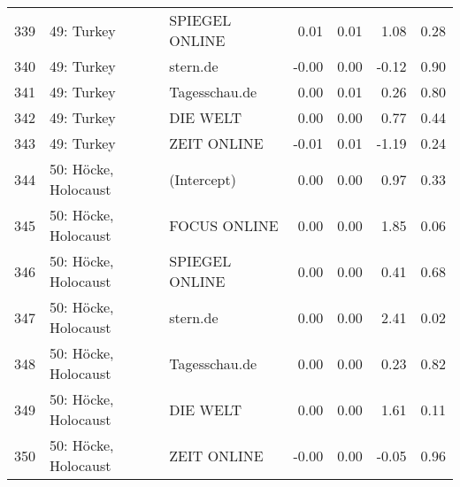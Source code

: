 \begin{table}[ht]
{\begin{tabular}{rllrrrr}
  339 & 49: Turkey & SPIEGEL ONLINE & 0.01 & 0.01 & 1.08 & 0.28 \\ 
  340 & 49: Turkey & stern.de & -0.00 & 0.00 & -0.12 & 0.90 \\ 
  341 & 49: Turkey & Tagesschau.de & 0.00 & 0.01 & 0.26 & 0.80 \\ 
  342 & 49: Turkey & DIE WELT & 0.00 & 0.00 & 0.77 & 0.44 \\ 
  343 & 49: Turkey & ZEIT ONLINE & -0.01 & 0.01 & -1.19 & 0.24 \\ 
  344 & 50: Höcke, Holocaust & (Intercept) & 0.00 & 0.00 & 0.97 & 0.33 \\ 
  345 & 50: Höcke, Holocaust & FOCUS ONLINE & 0.00 & 0.00 & 1.85 & 0.06 \\ 
  346 & 50: Höcke, Holocaust & SPIEGEL ONLINE & 0.00 & 0.00 & 0.41 & 0.68 \\ 
  347 & 50: Höcke, Holocaust & stern.de & 0.00 & 0.00 & 2.41 & 0.02 \\ 
  348 & 50: Höcke, Holocaust & Tagesschau.de & 0.00 & 0.00 & 0.23 & 0.82 \\ 
  349 & 50: Höcke, Holocaust & DIE WELT & 0.00 & 0.00 & 1.61 & 0.11 \\ 
  350 & 50: Höcke, Holocaust & ZEIT ONLINE & -0.00 & 0.00 & -0.05 & 0.96 \\ 
   \hline
\end{tabular}
}
\end{table}
